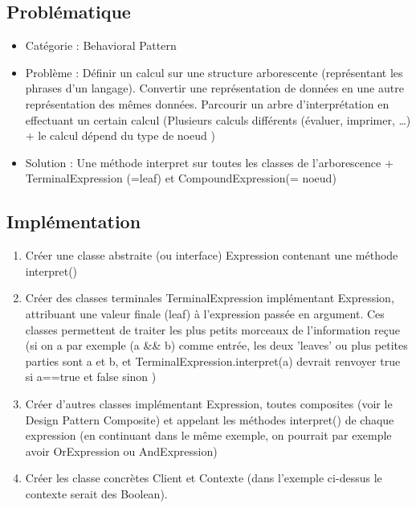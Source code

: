 \subsection{Problématique}
\begin{itemize}
    \item Catégorie : Behavioral Pattern
    \item Problème : Définir un calcul sur une structure arborescente (représentant les phrases d'un langage). Convertir une représentation de données en une autre représentation des mêmes données. Parcourir un arbre d’interprétation en effectuant un certain calcul (Plusieurs calculs différents (évaluer, imprimer, …) + le calcul dépend du type de noeud )
    \item Solution : Une méthode interpret sur toutes les classes de l'arborescence + TerminalExpression (=leaf) et CompoundExpression(= noeud)
\end{itemize}
\subsection{Implémentation}
\begin{enumerate}
    \item Créer une classe abstraite (ou interface) Expression contenant une méthode interpret()
    \item Créer des classes terminales TerminalExpression implémentant Expression, attribuant une valeur finale (leaf) à l’expression passée en argument. Ces classes permettent de traiter les plus petits morceaux de l'information reçue (si on a par exemple (a \&\& b) comme entrée, les deux 'leaves' ou plus petites parties sont a et b, et TerminalExpression.interpret(a) devrait renvoyer true si a==true et false sinon )
    \item Créer d’autres classes implémentant Expression, toutes composites (voir le Design Pattern Composite) et appelant les méthodes interpret() de chaque expression (en continuant dans le même exemple, on pourrait par exemple avoir OrExpression ou AndExpression)
    \item Créer les classe concrètes Client et Contexte (dans l'exemple ci-dessus le contexte serait des Boolean).

\end{enumerate}

